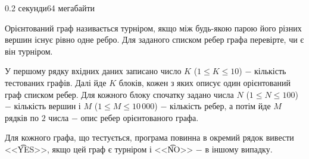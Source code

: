 \begin{problem}{}{}{}{0.2 секунди}{64 мегабайти}

Орієнтований граф називається турніром, якщо між будь-якою парою його різних вершин існує рівно одне ребро. 
Для заданого списком ребер графа перевірте, чи є він турніром.

\InputFile
У першому рядку вхідних даних записано число $K$ ($1 \le K \le 10$) $-$ кількість тестованих графів. 
Далі йде $K$ блоків, кожен з яких описує один орієнтований граф списком ребер. 
Для кожного блоку спочатку задано числа $N$ ($1 \le N \le 100$) $-$ кількість вершин і $M$ ($1 \le M \le 10\,000$) $-$
кількість ребер, а потім йде $M$ рядків по $2$ числа $-$ опис ребер орієнтованого графа.

\OutputFile
Для кожного графа, що тестується, програма повинна в окремий рядок вивести <<{\t{YES}}>>, якщо цей граф
є турніром і <<{\t{NO}}>> $-$ в іншому випадку.


\Example

\begin{example}
%
\end{example}

\end{problem}

